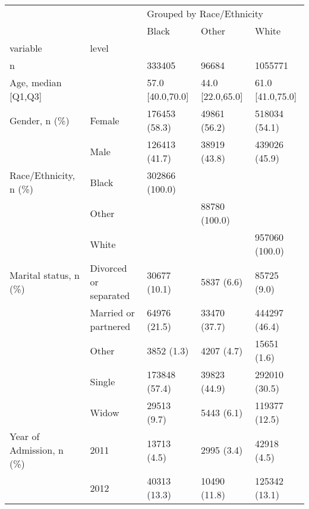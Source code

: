 \begin{tabular}{lllll}
\toprule
                                       &   & \multicolumn{3}{l}{Grouped by Race/Ethnicity} \\
                                       &   &                     Black &              Other &              White \\
variable & level &                           &                    &                    \\
\midrule
n &   &                    333405 &              96684 &            1055771 \\
Age, median [Q1,Q3] &   &          57.0 [40.0,70.0] &   44.0 [22.0,65.0] &   61.0 [41.0,75.0] \\
Gender, n (\%) & Female &             176453 (58.3) &       49861 (56.2) &      518034 (54.1) \\
                                       & Male &             126413 (41.7) &       38919 (43.8) &      439026 (45.9) \\
Race/Ethnicity, n (\%) & Black &            302866 (100.0) &                    &                    \\
                                       & Other &                           &      88780 (100.0) &                    \\
                                       & White &                           &                    &     957060 (100.0) \\
Marital status, n (\%) & Divorced or separated &              30677 (10.1) &         5837 (6.6) &        85725 (9.0) \\
                                       & Married or partnered &              64976 (21.5) &       33470 (37.7) &      444297 (46.4) \\
                                       & Other &                3852 (1.3) &         4207 (4.7) &        15651 (1.6) \\
                                       & Single &             173848 (57.4) &       39823 (44.9) &      292010 (30.5) \\
                                       & Widow &               29513 (9.7) &         5443 (6.1) &      119377 (12.5) \\
Year of Admission, n (\%) & 2011 &               13713 (4.5) &         2995 (3.4) &        42918 (4.5) \\
                                       & 2012 &              40313 (13.3) &       10490 (11.8) &      125342 (13.1) \\

\end{tabular}

